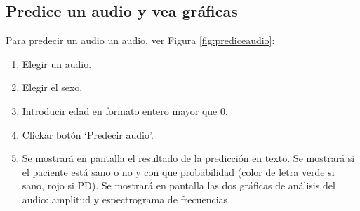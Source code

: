 \subsection{Predice un audio y vea gráficas}
Para predecir un audio un audio, ver Figura \ref{fig:prediceaudio}:
\begin{enumerate}
\item Elegir un audio. 
\item Elegir el sexo.
\item Introducir edad en formato entero mayor que 0.
\item Clickar botón `Predecir audio'.
\item Se mostrará en pantalla el resultado de la predicción en texto. Se mostrará si el paciente está sano o no y con que probabilidad (color de letra verde si sano, rojo si PD). Se mostrará en pantalla las dos gráficas de análisis del audio: amplitud y espectrograma de frecuencias.
\end{enumerate}

